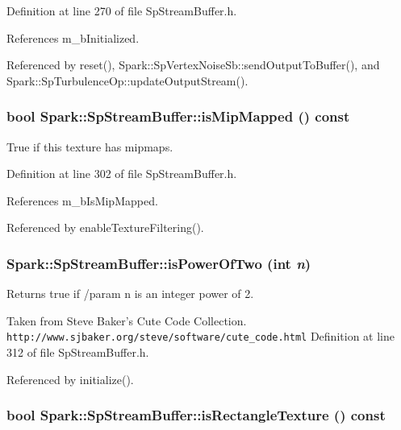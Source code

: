 Definition at line 270 of file Sp\-Stream\-Buffer.h.

References m\_\-b\-Initialized.

Referenced by reset(), Spark::Sp\-Vertex\-Noise\-Sb::send\-Output\-To\-Buffer(), and Spark::Sp\-Turbulence\-Op::update\-Output\-Stream().
\subsubsection{\setlength{\rightskip}{0pt plus 5cm}bool Spark::Sp\-Stream\-Buffer::is\-Mip\-Mapped () const\hspace{0.3cm}{\tt  [inline]}}\label{classSpark_1_1SpStreamBuffer_a38}


True if this texture has mipmaps. 

Definition at line 302 of file Sp\-Stream\-Buffer.h.

References m\_\-b\-Is\-Mip\-Mapped.

Referenced by enable\-Texture\-Filtering().
\subsubsection{\setlength{\rightskip}{0pt plus 5cm}Spark::Sp\-Stream\-Buffer::is\-Power\-Of\-Two (int {\em n})\hspace{0.3cm}{\tt  [inline, static]}}\label{classSpark_1_1SpStreamBuffer_e0}


Returns true if /param n is an integer power of 2. 

Taken from Steve Baker's Cute Code Collection. {\tt http://www.sjbaker.org/steve/software/cute\_\-code.html} Definition at line 312 of file Sp\-Stream\-Buffer.h.

Referenced by initialize().
\subsubsection{\setlength{\rightskip}{0pt plus 5cm}bool Spark::Sp\-Stream\-Buffer::is\-Rectangle\-Texture () const\hspace{0.3cm}{\tt  [inline]}}\label{classSpark_1_1SpStreamBuffer_a35}


